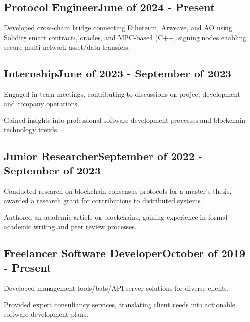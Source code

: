 \documentclass[a4paper,12pt]{article}
\begin{document}

\vspace*{6pt}
\subsection{{Protocol Engineer}\hfill June of 2024 - Present}
\begin{zitemize}
    \item Developed cross-chain bridge connecting Ethereum, Arweave, and AO using Solidity smart contracts, oracles, and MPC-based (C++) signing nodes enabling secure multi-network asset/data transfers.
\end{zitemize}


\vspace*{3pt}
\subsection{{Internship}\hfill June of 2023 - September of 2023}
\begin{zitemize}
    \item Engaged in team meetings, contributing to discussions on project development and company operations.
    \item Gained insights into professional software development processes and blockchain technology trends.
\end{zitemize}

\vspace*{1pt} 
\subsection{{Junior Researcher}\hfill September of 2022 - September of 2023}
\begin{zitemize}
    \item Conducted research on blockchain consensus protocols for a master's thesis, awarded a research grant for contributions to distributed systems.
    \item Authored an academic article on blockchains, gaining experience in formal academic writing and peer review processes.
\end{zitemize}

\vspace*{1pt} 
\subsection{{Freelancer Software Developer}\hfill October of 2019 - Present}
\begin{zitemize}
\item Developed management tools/bots/API server solutions for diverse clients.
\item Provided expert consultancy services, translating client needs into actionable software development plans.
\end{zitemize}
\end{document}
